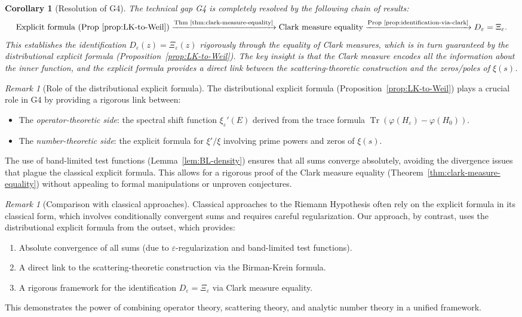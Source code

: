 ﻿\documentclass[12pt,a4paper]{article}
\newtheorem{corollary}[theorem]{Corollary}
\theoremstyle{definition}
\theoremstyle{remark}
\newtheorem{remark}[theorem]{Remark}
\newcommand{\Tr}{\operatorname{Tr}}
\begin{document}
\begin{corollary}[Resolution of G4]
\label{cor:G4-resolution}
The technical gap G4 is completely resolved by the following chain of results:
\[
  \text{Explicit formula (Prop~\ref{prop:LK-to-Weil})} \xrightarrow{\text{Thm~\ref{thm:clark-measure-equality}}} \text{Clark measure equality} \xrightarrow{\text{Prop~\ref{prop:identification-via-clark}}} D_\varepsilon = \Xi_\varepsilon.
\]
This establishes the identification $D_\varepsilon(z) = \Xi_\varepsilon(z)$ rigorously through the equality of Clark measures, which is in turn guaranteed by the distributional explicit formula (Proposition~\ref{prop:LK-to-Weil}). The key insight is that the Clark measure encodes all the information about the inner function, and the explicit formula provides a direct link between the scattering-theoretic construction and the zeros/poles of $\xi(s)$.
\end{corollary}

\begin{remark}[Role of the distributional explicit formula]
\label{rem:distributional-role}
The distributional explicit formula (Proposition~\ref{prop:LK-to-Weil}) plays a crucial role in G4 by providing a rigorous link between:
\begin{itemize}
\item The \emph{operator-theoretic side}: the spectral shift function $\xi_\varepsilon'(E)$ derived from the trace formula $\Tr(\varphi(H_\varepsilon) - \varphi(H_0))$.
\item The \emph{number-theoretic side}: the explicit formula for $\xi'/\xi$ involving prime powers and zeros of $\xi(s)$.
\end{itemize}
The use of band-limited test functions (Lemma~\ref{lem:BL-density}) ensures that all sums converge absolutely, avoiding the divergence issues that plague the classical explicit formula. This allows for a rigorous proof of the Clark measure equality (Theorem~\ref{thm:clark-measure-equality}) without appealing to formal manipulations or unproven conjectures.
\end{remark}

\begin{remark}[Comparison with classical approaches]
\label{rem:comparison-classical}
Classical approaches to the Riemann Hypothesis often rely on the explicit formula in its classical form, which involves conditionally convergent sums and requires careful regularization. Our approach, by contrast, uses the distributional explicit formula from the outset, which provides:
\begin{enumerate}
\item Absolute convergence of all sums (due to $\varepsilon$-regularization and band-limited test functions).
\item A direct link to the scattering-theoretic construction via the Birman-Krein formula.
\item A rigorous framework for the identification $D_\varepsilon = \Xi_\varepsilon$ via Clark measure equality.
\end{enumerate}
This demonstrates the power of combining operator theory, scattering theory, and analytic number theory in a unified framework.
\end{remark}
\end{document}
